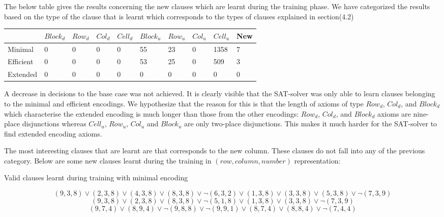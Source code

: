 \documentclass{article}
\begin{document}
\bigskip

The below table gives the results concerning the new clauses which are learnt during the training phase. We have categorized the results based on the type of the clause that is learnt which corresponds to the types of clauses explained in section(4.2)

\begin{center}
 \label{tab:title}
\begin{tabular}{ | l | l | l | l | l | l | l | l | l | l |}
	\hline
     & $Block_{d}$ & $Row_{d}$ & $Col_{d}$ & $Cell_{d}$ & $Block_{u}$ & $Row_{u}$ & $Col_{u}$ & $Cell_{u}$ & New \\ \hline
    Minimal & 0 & 0 & 0 & 0 & 55 & 23 & 0 & 1358  & 7 \\ \hline
    Efficient & 0 & 0 & 0 & 0 & 53 & 25 & 0 & 509  & 3  \\ \hline
    Extended & 0 & 0 & 0 & 0 & 0 & 0 & 0 & 0 & 0 \\
    \hline
\end{tabular}
\end{center}
\bigskip

A decrease in decisions to the base case was not achieved. It is clearly visible that the SAT-solver was only able to learn clauses belonging to the minimal and efficient encodings. We hypothesize that the reason for this is that the length of axioms of type $Row_d$, $Col_d$, and $Block_d$ which characterise the extended encoding is much longer than those from the other encodings: $Row_d$, $Col_d$, and $Block_d$ axioms are nine-place disjunctions whereas $Cell_u$, $Row_u$, $Col_u$ and $Block_u$ are only two-place disjunctions. This makes it much harder for the SAT-solver to find extended encoding axioms.

The most interesting clauses that are learnt are that corresponds to the new column. These clauses do not fall into any of the previous category. Below are some new clauses learnt during the training in $(row, column, number)$ representation:

\begin{center}
Valid clauses learnt during training with minimal encoding
\end{center}
\[(9, 3, 8) \lor (2, 3, 8) \lor (4, 3, 8) \lor (8, 3, 8) \lor \neg (6, 3, 2) \lor (1, 3, 8) \lor (3, 3, 8) \lor (5, 3, 8) \lor \neg (7, 3, 9)\]
\[(9, 3, 8 ) \lor (2, 3, 8 ) \lor (8, 3, 8 ) \lor \neg (5, 1, 8 ) \lor (1, 3, 8 ) \lor (3, 3, 8 ) \lor \neg (7, 3, 9 ) \]
\[(9, 7, 4) \lor (8, 9, 4) \lor \neg (9, 8, 8) \lor \neg (9, 9, 1) \lor (8, 7, 4) \lor (8, 8, 4) \lor \neg (7, 4, 4)\] \\\\
\end{document}
